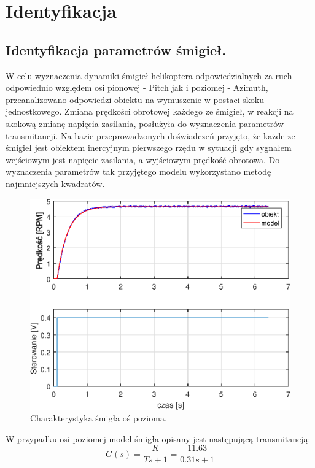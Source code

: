 \chapter{Identyfikacja}


\section{Identyfikacja parametrów śmigieł.}

W celu wyznaczenia dynamiki śmigieł helikoptera odpowiedzialnych za ruch odpowiednio względem osi pionowej - Pitch jak i poziomej - Azimuth, przeanalizowano odpowiedzi obiektu na wymuszenie w postaci skoku jednostkowego. Zmiana prędkości obrotowej każdego ze śmigieł, w reakcji na skokową zmianę napięcia zasilania, posłużyła do wyznaczenia parametrów transmitancji. Na bazie przeprowadzonych doświadczeń przyjęto, że każde ze śmigieł jest obiektem inercyjnym pierwszego rzędu w sytuacji gdy sygnałem wejściowym jest napięcie zasilania, a wyjściowym prędkość obrotowa. Do wyznaczenia parametrów tak przyjętego modelu wykorzystano metodę najmniejszych kwadratów. 

\begin{figure}[h!]
	\centering
	\includegraphics[scale = 1]{fig/Azimuth_iden.eps}
	\caption		
	{Charakterystyka śmigła oś pozioma.}
\end{figure} 
W przypadku osi poziomej model śmigła opisany jest następującą transmitancją:
\begin{equation}\label{key}
G(s) = \frac{K}{Ts + 1} = \frac{11.63}{0.31s + 1}
\end{equation}

